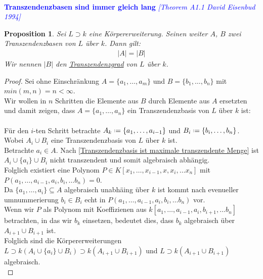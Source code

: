 \documentclass[10pt,a4paper]{report}
\newcommand{\comment}[1]{}
\newcommand{\ModulsOfDifferenzials}{David Eisenbud 1994}
\newcounter{Aussage}[chapter]
\newtheorem{prop}[Aussage]{Proposition}
\newcommand*{\defeq}{\mathrel{\vcenter{\baselineskip0.5ex \lineskiplimit0pt
                     \hbox{\scriptsize.}\hbox{\scriptsize.}}}%
                     =}
\begin{document}
\ \\
\textcolor{blue}{\textbf{Transzendenzbasen sind immer gleich lang} \textit{[Theorem A1.1 \ModulsOfDifferenzials]}}
\begin{prop}\comment{\label{Transzendenzbasen sind immer gleich lang}}
Sei $L \supset k$ eine Körpererweiterung. Seinen weiter $A$, $B$ zwei Transzendenzbasen von $L$ über $k$. Dann gilt:
\begin{gather*}
\vert A \vert = \vert B \vert
\end{gather*}
Wir nennen $\vert B \vert$ den \underline{Transzendenzgrad} von $L$ über $k$.
\end{prop}
\begin{proof}
Sei ohne Einschränkung $A = \lbrace a_1, \dots , a_m \rbrace$ und $B = \lbrace b_1, \dots , b_n \rbrace$ mit $min(m,n) = n < \infty$.\\
Wir wollen in $n$ Schritten die Elemente aus $B$ durch Elemente aus $A$ ersetzten und damit zeigen, dass $A = \lbrace a_1, \dots , a_n \rbrace$ ein Transzendenzbasis von $L$ über $k$ ist:\\
\ \\
Für den $i$-ten Schritt betrachte $A_k \defeq \lbrace a_1, \dots , a_{i-1} \rbrace$ und $B_i \defeq \lbrace b_i, \dots , b_n \rbrace$. Wobei $A_i \cup B_i$ eine Transzendenzbasis von $L$ über $k$ ist.\\
Betrachte $a_i \in A$. Nach \cref{Transzendenzbasis ist maximale transzendente Menge} ist $A_i \cup \lbrace a_i \rbrace \cup B_i$ nicht transzendent und somit algebraisch abhängig.\\
Folglich existiert eine Polynom $P \comment{(x_1, \dots , x_{i-1}, x ,x_i, \dots x_n)} \in K[x_1, \dots , x_{i-1}, x ,x_i, \dots x_n] $ mit\\
$P(a_1, \dots , a_{i-1}, a_i ,b_i, \dots b_n) = 0$.\\
Da $\lbrace a_1, \dots , a_i \rbrace \subseteq A$ algebraisch unabhäing über $k$ ist kommt nach evenueller umnummerierung $b_i \in B_i$ echt in $P(a_1, \dots , a_{i-1}, a_i ,b_i, \dots b_n)$ vor.\\
Wenn wir $P$ als Polynom mit Koeffizienen aus $k[a_1, \dots , a_{i-1}, a_i ,b_{i+1}, \dots b_n]$ betrachten, in das wir $b_k$ einsetzen, bedeutet dies, dass $b_k$ algebraisch über $A_{i+1} \cup B_{i+1}$ ist.\\
Folglich sind die Körpererweiterungen $L\supset k(A_i \cup \lbrace a_i \rbrace \cup B_i) \supset k(A_{i+1} \cup B_{i+1})$ und $L\supset k(A_{i+1} \cup B_{i+1})$ algebraisch.\\

\end{proof}
\end{document}
